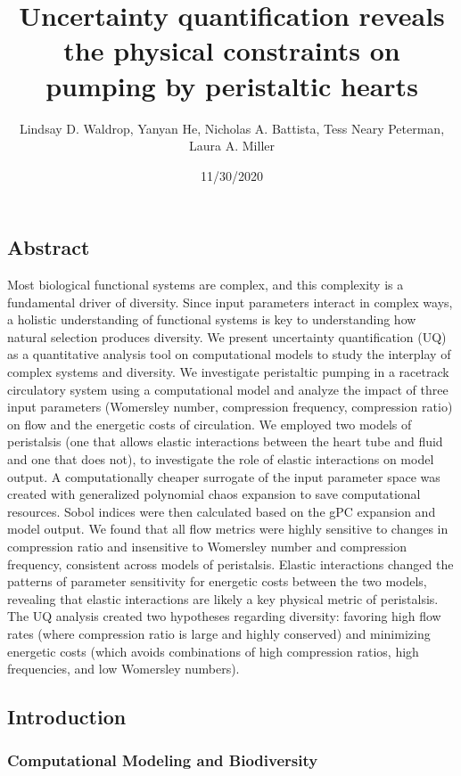 \documentclass[
]{article}
\title{Uncertainty quantification reveals the physical constraints on
pumping by peristaltic hearts}
\author{Lindsay D. Waldrop, Yanyan He, Nicholas A. Battista, Tess Neary
Peterman, Laura A. Miller}
\date{11/30/2020}
\begin{document}
\maketitle

\hypertarget{abstract}{%
\subsection{Abstract}\label{abstract}}

Most biological functional systems are complex, and this complexity is a
fundamental driver of diversity. Since input parameters interact in
complex ways, a holistic understanding of functional systems is key to
understanding how natural selection produces diversity. We present
uncertainty quantification (UQ) as a quantitative analysis tool on
computational models to study the interplay of complex systems and
diversity. We investigate peristaltic pumping in a racetrack circulatory
system using a computational model and analyze the impact of three input
parameters (Womersley number, compression frequency, compression ratio)
on flow and the energetic costs of circulation. We employed two models
of peristalsis (one that allows elastic interactions between the heart
tube and fluid and one that does not), to investigate the role of
elastic interactions on model output. A computationally cheaper
surrogate of the input parameter space was created with generalized
polynomial chaos expansion to save computational resources. Sobol
indices were then calculated based on the gPC expansion and model
output. We found that all flow metrics were highly sensitive to changes
in compression ratio and insensitive to Womersley number and compression
frequency, consistent across models of peristalsis. Elastic interactions
changed the patterns of parameter sensitivity for energetic costs
between the two models, revealing that elastic interactions are likely a
key physical metric of peristalsis. The UQ analysis created two
hypotheses regarding diversity: favoring high flow rates (where
compression ratio is large and highly conserved) and minimizing
energetic costs (which avoids combinations of high compression ratios,
high frequencies, and low Womersley numbers).

\hypertarget{introduction}{%
\subsection{Introduction}\label{introduction}}

\hypertarget{computational-modeling-and-biodiversity}{%
\subsubsection{Computational Modeling and
Biodiversity}\label{computational-modeling-and-biodiversity}}
\end{document}
